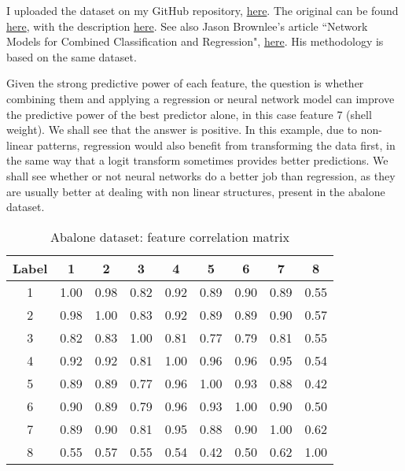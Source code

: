 \documentclass[oneside,10pt]{book}
\begin{document}
I uploaded the dataset on my GitHub repository, \href{https://github.com/VincentGranville/Statistical-Optimization/blob/main/thinning_abalone.csv}{here}. The original can be found \href{https://raw.githubusercontent.com/jbrownlee/Datasets/master/abalone.csv}{here}, with the description
 \href{https://raw.githubusercontent.com/jbrownlee/Datasets/master/abalone.names}{here}. See also Jason Brownlee's article
 ``Network Models for Combined Classification and Regression", \href{https://machinelearningmastery.com/neural-network-models-for-combined-classification-and-regression/}{here}. His methodology is based on the same dataset.

Given the strong predictive power of each feature, the question is whether combining them and applying a regression or neural network model can improve the predictive power of the best predictor alone, in this case feature 7 (shell weight). We shall see that the answer is positive. In this example, due
 to non-linear patterns, regression would also benefit from transforming the data first, in the same way that a logit transform sometimes provides better predictions. We shall see
 whether or not neural networks do a better job than regression, as they are usually better at dealing with non linear structures, present
 in the abalone dataset.

\begin{table}[H]
\begin{center}
\begin{tabular}{|c|ccccccc|c|}
\hline
  Label & 1 &         2 &         3 &         4 &         5 &         6 &         7 &         8 \\
\hline
\hline
1  &1.00  &0.98  &0.82  &0.92  &0.89  &0.90  &0.89  &0.55\\
2  &0.98  &1.00  &0.83  &0.92  &0.89  &0.89  &0.90  &0.57\\
3  &0.82  &0.83  &1.00  &0.81  &0.77  &0.79  &0.81  &0.55\\
4  &0.92  &0.92  &0.81  &1.00  &0.96  &0.96  &0.95  &0.54\\
5  &0.89  &0.89  &0.77  &0.96  &1.00  &0.93  &0.88  &0.42\\
6  &0.90  &0.89  &0.79  &0.96  &0.93  &1.00  &0.90  &0.50\\
7  &0.89  &0.90  &0.81  &0.95  &0.88  &0.90  &1.00  &0.62\\
8  &0.55  &0.57  &0.55  &0.54  &0.42  &0.50  &0.62  &1.00\\
\hline
\end{tabular}
\caption{\label{choctreyur} Abalone dataset: feature correlation matrix}
\end{center}
\end{table}
\end{document}
